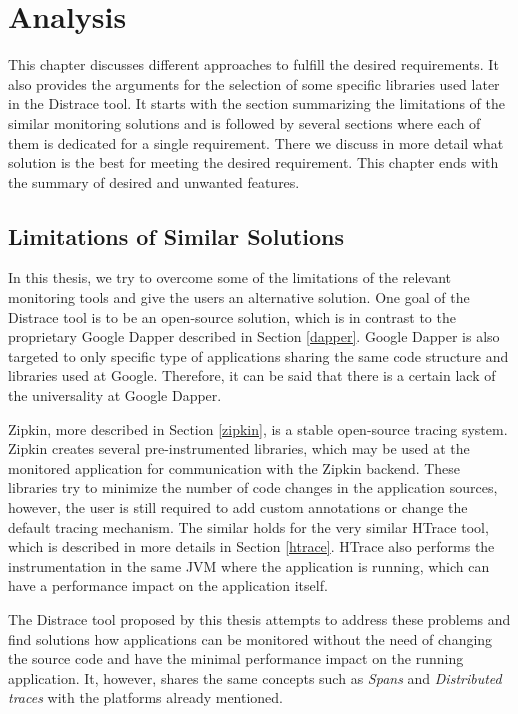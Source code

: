 \chapter{Analysis}
\label{analysis}
This chapter discusses different approaches to fulfill the desired requirements. It also provides the arguments for the selection of some specific libraries used later in the Distrace tool. It starts with the section summarizing the limitations of the similar monitoring solutions and is followed by several sections where each of them is dedicated for a single requirement. There we discuss in more detail what solution is the best for meeting the desired requirement. This chapter ends with the summary of desired and unwanted features.

\section{Limitations of Similar Solutions}
In this thesis, we try to overcome some of the limitations of the relevant monitoring tools and give the users an alternative solution. One goal of the Distrace tool is to be an open-source solution, which is in contrast to the proprietary Google Dapper described in Section \ref{dapper}. Google Dapper is also targeted to only specific type of applications sharing the same code structure and libraries used at Google. Therefore, it can be said that there is a certain lack of the universality at Google Dapper. 

Zipkin, more described in Section \ref{zipkin}, is a stable open-source tracing system. Zipkin creates several pre-instrumented libraries, which may be used at the monitored application for communication with the Zipkin backend. These libraries try to minimize the number of code changes in the application sources, however, the user is still required to add custom annotations or change the default tracing mechanism. The similar holds for the very similar HTrace tool, which is described in more details in Section \ref{htrace}. HTrace also performs the instrumentation in the same JVM where the application is running, which can have a performance impact on the application itself.

The Distrace tool proposed by this thesis attempts to address these problems and find solutions how applications can be monitored without the need of changing the source code and have the minimal performance impact on the running application. It, however, shares the same concepts such as \textit{Spans} and\textit{ Distributed traces} with the platforms already mentioned.
